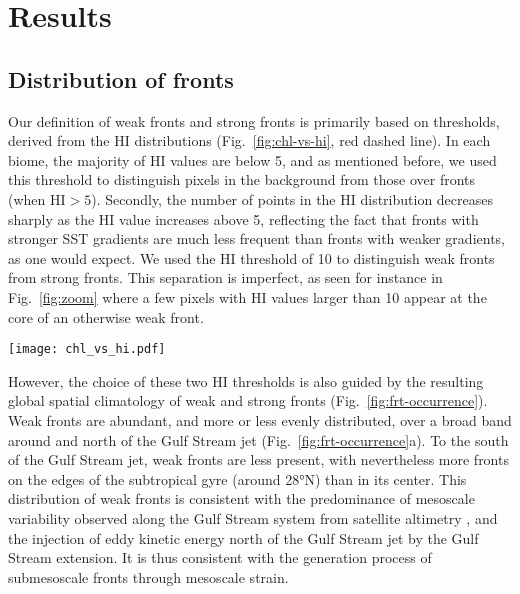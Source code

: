 \section{Results}

\subsection{Distribution of fronts}

Our definition of weak fronts and strong fronts is primarily based on thresholds, derived from the HI distributions (Fig.~\ref{fig:chl-vs-hi}, red dashed line).
In each biome, the majority of HI values are below 5, and as mentioned before, we used this threshold to distinguish pixels in the background from those over fronts (when \(\mathrm{HI} > 5\)).
Secondly, the number of points in the HI distribution decreases sharply as the HI value increases above 5, reflecting the fact that fronts with stronger SST gradients are much less frequent than fronts with weaker gradients, as one would expect.
We used the HI threshold of 10 to distinguish weak fronts from strong fronts.
This separation is imperfect, as seen for instance in Fig.~\ref{fig:zoom} where a few pixels with HI values larger than 10 appear at the core of an otherwise weak front.

\begin{figure*}
  \texttt{[image: chl\_vs\_hi.pdf]}
  \caption{
    Normalized distribution of the Heterogeneity Index (HI, red dashed line) within each biome, and distribution of Chl\nobreakdash-\emph{a} as a function of HI (representing front strength), over the full period 2000--2020.
    Shown are the median value of the Chl\nobreakdash-\emph{a} distributions (solid black line), and 1st and 3rd quartiles (dashed lines).
    Note that 0.5\% of pixels have outstanding large HI values and are not included here.
  }%
  \label{fig:chl-vs-hi}
\end{figure*}

However, the choice of these two HI thresholds is also guided by the resulting global spatial climatology of weak and strong fronts (Fig.~\ref{fig:frt-occurrence}).
Weak fronts are abundant, and more or less evenly distributed, over a broad band around and north of the Gulf Stream jet (Fig.~\ref{fig:frt-occurrence}a).
To the south of the Gulf Stream jet, weak fronts are less present, with nevertheless more fronts on the edges of the subtropical gyre (around 28°N) than in its center.
This distribution of weak fronts is consistent with the predominance of mesoscale variability observed along the Gulf Stream system from satellite altimetry \citep{zhai_2008}, and the injection of eddy kinetic energy north of the Gulf Stream jet by the Gulf Stream extension.
It is thus consistent with the generation process of submesoscale fronts through mesoscale strain.

